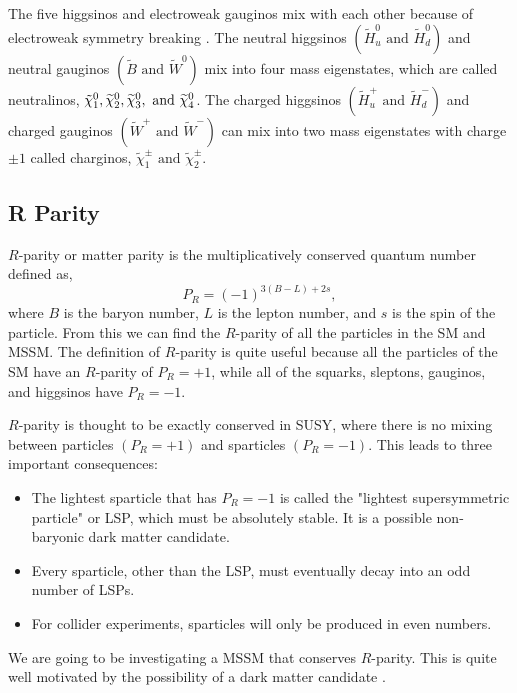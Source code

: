 The five higgsinos and electroweak gauginos mix with each other because of electroweak symmetry breaking \cite{martin_supersymmetry_1997}. The neutral higgsinos $(\widetilde{H}_u^0 \text{ and } \widetilde{H}_d^0)$ and neutral gauginos $(\widetilde{B} \text{ and } \widetilde{W}^0)$ mix into four mass eigenstates, which are called neutralinos, $\tilde{\chi}^{0}_{1}, \widetilde{\chi}^0_2, \widetilde{\chi}^0_3, \text{ and }\widetilde{\chi}^0_4$. The charged higgsinos $(\widetilde{H}_u^+ \text{ and } \widetilde{H}_d^-)$ and charged gauginos $(\widetilde{W}^+\text{ and } \widetilde{W}^-)$ can mix into two mass eigenstates with charge $\pm1$ called charginos,  $\widetilde{\chi}^\pm_1 \text{ and } \widetilde{\chi}^\pm_2$. 

\subsection{R Parity}
\label{subsec:rparity}

$R$-parity or matter parity is the multiplicatively conserved quantum number \cite{wess_supergauge_1974, farrar_phenomenology_1978} defined as, 
\begin{equation} \label{RParity}
P_R=(-1)^{3(B-L)+2s}, 
\end{equation}
where $B$ is the baryon number, $L$ is the lepton number, and $s$ is the spin of the particle. From this we can find the $R$-parity of all the particles in the SM and MSSM. The definition of $R$-parity is quite useful because all the particles of the SM have an $R$-parity of $P_R=+1$, while all of the squarks, sleptons, gauginos, and higgsinos have $P_R=-1$.

$R$-parity is thought to be exactly conserved in SUSY, where there is no mixing between particles $(P_R=+1)$ and sparticles $(P_R=-1)$. This leads to three important consequences:
\begin{itemize}
	 \item The lightest sparticle that has $P_R=-1$ is called the "lightest supersymmetric particle" or LSP, which must be absolutely stable. It is a possible non-baryonic dark matter candidate.
	 \item Every sparticle, other than the LSP, must eventually decay into an odd number of LSPs.
	 \item For collider experiments, sparticles will only be produced in even numbers.
\end{itemize}
 We are going to be investigating a MSSM that conserves $R$-parity. This is quite well motivated by the possibility of a dark matter candidate \cite{feng_dark_2010}. 

